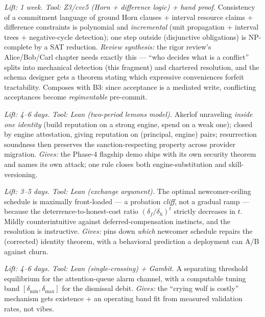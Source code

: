 \documentclass[11pt,a4paper]{article}
\begin{document}
\begin{description}[leftmargin=0em,style=unboxed]
\item[B4. A tractable deontic-conflict fragment.] \emph{Lift: 1 week. Tool: Z3/cvc5 (Horn + difference logic) + hand proof.} Consistency of a commitment language of ground Horn clauses + interval resource claims + difference constraints is polynomial and \emph{incremental} (unit propagation + interval trees + negative-cycle detection); one step outside (disjunctive obligations) is NP-complete by a SAT reduction. \emph{Review synthesis:} the rigor review's Alice/Bob/Carl chapter needs exactly this --- ``who decides what is a conflict'' splits into mechanical detection (this fragment) and chartered resolution, and the schema designer gets a theorem stating which expressive conveniences forfeit tractability. Composes with B3: since acceptance is a mediated write, conflicting acceptances become \emph{regimentable} pre-commit.

\item[B5. Engine substitution / resurrection soundness.] \emph{Lift: 4--6 days. Tool: Lean (two-period lemons model).} Akerlof unraveling \emph{inside one identity} (build reputation on a strong engine, spend on a weak one); closed by engine attestation, giving reputation on (principal, engine) pairs; resurrection soundness then preserves the sanction-respecting property across provider migration. \emph{Gives:} the Phase-4 flagship demo ships with its own security theorem and names its own attack; one rule closes both engine-substitution and skill-versioning.

\item[B6. The front-loaded probation theorem.] \emph{Lift: 3--5 days. Tool: Lean (exchange argument).} The optimal newcomer-ceiling schedule is maximally front-loaded --- a probation \emph{cliff}, not a gradual ramp --- because the deterrence-to-honest-cost ratio $(\delta_f/\delta_h)^t$ strictly decreases in $t$. Mildly counterintuitive against deferred-compensation instincts, and the resolution is instructive. \emph{Gives:} pins down \emph{which} newcomer schedule repairs the (corrected) identity theorem, with a behavioral prediction a deployment can A/B against churn.

\item[B7. Costly-escalation signaling.] \emph{Lift: 4--6 days. Tool: Lean (single-crossing) + Gambit.} A separating threshold equilibrium for the attention-queue alarm channel, with a computable tuning band $[\delta_\text{min},\delta_\text{max}]$ for the dismissal debit. \emph{Gives:} the ``crying wolf is costly'' mechanism gets existence + an operating band fit from measured validation rates, not vibes.


\end{description}
\end{document}
